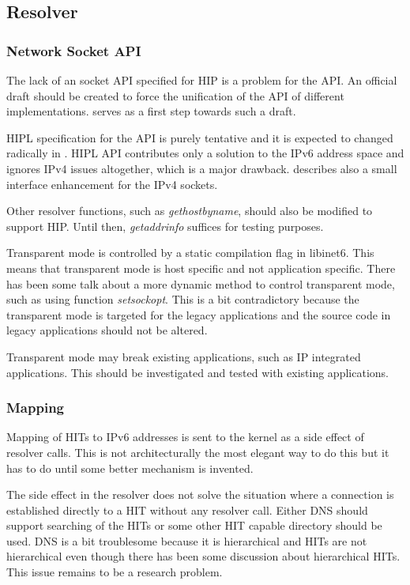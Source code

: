 \subsection{Resolver}
\label{sec:resolver_future_work}

\subsubsection{Network Socket API}
\label{sec:api_future_work}

The lack of an socket API specified for HIP is a problem for the
API. An official draft should be created to force the unification of
the API of different implementations. \cite{hipapi} serves as a first
step towards such a draft.

HIPL specification for the API  is
purely tentative and it is expected to changed radically in
\cite{hipapi}. HIPL API contributes only a solution to the IPv6
address space and ignores IPv4 issues altogether, which is a major
drawback. \cite{boeing} describes also a small interface enhancement
for the IPv4 sockets.

Other resolver functions, such as \textit{gethostbyname}, should also
be modified to support HIP. Until then, \textit{getaddrinfo} suffices
for testing purposes.

Transparent mode is controlled by a static compilation flag in
libinet6. This means that transparent mode is host specific and not
application specific. There has been some talk about a more dynamic
method to control transparent mode, such as using function
\textit{setsockopt}. This is a bit contradictory because the
transparent mode is targeted for the legacy applications and the
source code in legacy applications should not be altered.

Transparent mode may break existing applications, such as IP
integrated applications. This should be investigated and tested with
existing applications.

\subsubsection{Mapping}
\label{sec:mapping_future_work}

Mapping of HITs to IPv6 addresses is sent to the kernel as a side
effect of resolver calls. This is not architecturally the most elegant
way to do this but it has to do until some better mechanism is
invented.

The side effect in the resolver does not solve the situation where a
connection is established directly to a HIT without any resolver
call. Either DNS should support searching of the HITs or some other
HIT capable directory should be used. DNS is a bit troublesome because
it is hierarchical and HITs are not hierarchical even though there has
been some discussion about hierarchical HITs. This issue remains to be
a research problem.

